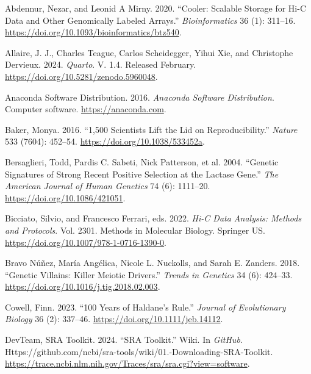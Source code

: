 \documentclass[
  11pt,
  a4paper,
]{scrbook}
\newlength{\cslhangindent}
\newenvironment{CSLReferences}[2] %
 {\begin{list}{}{%
  \setlength{\itemindent}{0pt}
  \setlength{\leftmargin}{0pt}
  \setlength{\parsep}{0pt}
  \ifodd #1
   \setlength{\leftmargin}{\cslhangindent}
   \setlength{\itemindent}{-1\cslhangindent}
  \fi
  \setlength{\itemsep}{#2\baselineskip}}}
 {\end{list}}
\begin{document}
\protect{}\label{refs}
\begin{CSLReferences}{1}{1}
Abdennur, Nezar, and Leonid A Mirny. 2020. {``Cooler: Scalable Storage
for {Hi-C} Data and Other Genomically Labeled Arrays.''}
\emph{Bioinformatics} 36 (1): 311--16.
\url{https://doi.org/10.1093/bioinformatics/btz540}.

Allaire, J. J., Charles Teague, Carlos Scheidegger, Yihui Xie, and
Christophe Dervieux. 2024. \emph{{Quarto}}. V. 1.4. Released February.
\url{https://doi.org/10.5281/zenodo.5960048}.

Anaconda Software Distribution. 2016. \emph{Anaconda Software
Distribution}. Computer software. \url{https://anaconda.com}.

Baker, Monya. 2016. {``1,500 Scientists Lift the Lid on
Reproducibility.''} \emph{Nature} 533 (7604): 452--54.
\url{https://doi.org/10.1038/533452a}.

Bersaglieri, Todd, Pardis C. Sabeti, Nick Patterson, et al. 2004.
{``Genetic {Signatures} of {Strong Recent Positive Selection} at the
{Lactase Gene}.''} \emph{The American Journal of Human Genetics} 74 (6):
1111--20. \url{https://doi.org/10.1086/421051}.

Bicciato, Silvio, and Francesco Ferrari, eds. 2022. \emph{Hi-{C Data
Analysis}: {Methods} and {Protocols}}. Vol. 2301. Methods in {Molecular
Biology}. Springer US. \url{https://doi.org/10.1007/978-1-0716-1390-0}.

Bravo Núñez, María Angélica, Nicole L. Nuckolls, and Sarah E. Zanders.
2018. {``Genetic {Villains}: {Killer Meiotic Drivers}.''} \emph{Trends
in Genetics} 34 (6): 424--33.
\url{https://doi.org/10.1016/j.tig.2018.02.003}.

Cowell, Finn. 2023. {``100 Years of {Haldane}'s Rule.''} \emph{Journal
of Evolutionary Biology} 36 (2): 337--46.
\url{https://doi.org/10.1111/jeb.14112}.

DevTeam, SRA Toolkit. 2024. {``{SRA Toolkit}.''} Wiki. In \emph{GitHub}.
Https://github.com/ncbi/sra-tools/wiki/01.-Downloading-SRA-Toolkit.
\url{https://trace.ncbi.nlm.nih.gov/Traces/sra/sra.cgi?view=software}.


\end{CSLReferences}
\end{document}
